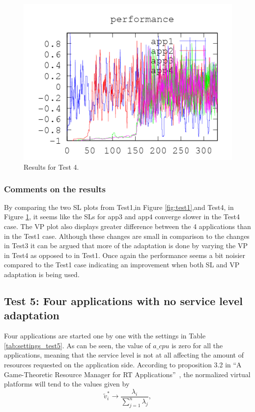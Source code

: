\documentclass[nobiblatex]{LTHthesis}
\newcommand{\tv}{\tilde{v}}
\begin{document}
\begin{figure}[th]
\begin{minipage}{0.49\textwidth}
  \includegraphics[width=\textwidth]{"tools/plot/logs/test4/f"}
  \end{minipage}
\caption{Results for Test 4.}
\label{fig:test4}
\end{figure}

\clearpage
\subsubsection{Comments on the results}
By comparing the two SL plots from Test1,in Figure \ref{fig:test1},and Test4, in Figure \ref{fig:test4}, it seems like the SLs for app3 and app4 converge slower in the Test4 case. 
The VP plot also displays greater difference between the 4 applications than in the Test1 case. Although these changes are small in comparison to the changes in Test3 it can be argued that more of the adaptation is done by varying the VP in Test4 as opposed to in Test1. Once again the performance seems a bit noisier compared to the Test1 case indicating an improvement when both SL and VP adaptation is being used.

\subsection{Test 5: Four applications with no service level adaptation}

Four applications are started one by one with the settings in 
Table \ref{tab:settings_test5}. As can be seen, the value of $a\_cpu$ is
zero for all the applications, meaning that the service level is not
at all affecting the amount of resources requested on the application side.
According to proposition 3.2 in ``A Game-Theoretic Resource Manager for 
RT Applications''~\cite{gtrm}, the normalized virtual platforms will tend 
to the values given by
\begin{equation}
  \tv_i^* \to \frac{\lambda_i}{\sum_{j=1}^{n}\lambda_j},
  \label{eq:SpecialStationaryPoint}
\end{equation}
\end{document}
